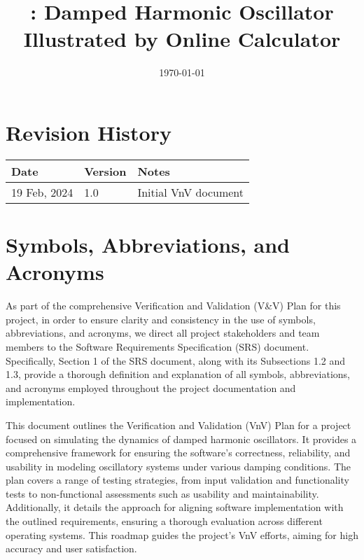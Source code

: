 \documentclass[12pt, titlepage]{article}
\begin{document}
\title{\progname: Damped Harmonic Oscillator Illustrated by Online Calculator} 
\author{\authname}
\date{\today}
	
\maketitle


\section*{Revision History}

\begin{tabularx}{\textwidth}{p{3cm}p{2cm}X}
\toprule {\bf Date} & {\bf Version} & {\bf Notes}\\
\midrule
19 Feb, 2024 & 1.0 & Initial VnV document\\
\bottomrule
\end{tabularx}

\newpage

\tableofcontents

\newpage
{}

\section{Symbols, Abbreviations, and Acronyms}

As part of the comprehensive Verification and Validation (V\&V) Plan for this project, in 
order to ensure clarity and consistency in the use of symbols, abbreviations, and 
acronyms, we direct all project stakeholders and team members to the Software Requirements 
Specification (SRS) document. Specifically, Section 1 of the SRS document, along with its 
Subsections 1.2 and 1.3, provide a thorough definition and explanation of all symbols, 
abbreviations, and acronyms employed throughout the project documentation and 
implementation. 

\newpage

This document outlines the Verification and Validation (VnV) Plan for a 
project focused on simulating the dynamics of damped harmonic oscillators. It provides 
a comprehensive framework for ensuring the software's correctness, reliability, and 
usability in modeling oscillatory systems under various damping conditions. The plan 
covers a range of testing strategies, from input validation and functionality tests to 
non-functional assessments such as usability and maintainability. Additionally, it 
details the approach for aligning software implementation with the outlined requirements, 
ensuring a thorough evaluation across different operating systems. This roadmap guides the 
project's VnV efforts, aiming for high accuracy and user satisfaction.
\end{document}
